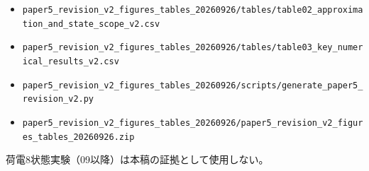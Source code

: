 \documentclass[
  a4paper,
]{ltjsarticle}
\begin{document}
\begin{itemize}
\item
  \texttt{paper5\_\allowbreak{}revision\_\allowbreak{}v2\_\allowbreak{}figures\_\allowbreak{}tables\_\allowbreak{}20260926/\allowbreak{}tables/\allowbreak{}table02\_\allowbreak{}approximation\_\allowbreak{}and\_\allowbreak{}state\_\allowbreak{}scope\_\allowbreak{}v2.csv}
\item
  \texttt{paper5\_\allowbreak{}revision\_\allowbreak{}v2\_\allowbreak{}figures\_\allowbreak{}tables\_\allowbreak{}20260926/\allowbreak{}tables/\allowbreak{}table03\_\allowbreak{}key\_\allowbreak{}numerical\_\allowbreak{}results\_\allowbreak{}v2.csv}
\item
  \texttt{paper5\_\allowbreak{}revision\_\allowbreak{}v2\_\allowbreak{}figures\_\allowbreak{}tables\_\allowbreak{}20260926/\allowbreak{}scripts/\allowbreak{}generate\_\allowbreak{}paper5\_\allowbreak{}revision\_\allowbreak{}v2.py}
\item
  \texttt{paper5\_\allowbreak{}revision\_\allowbreak{}v2\_\allowbreak{}figures\_\allowbreak{}tables\_\allowbreak{}20260926/\allowbreak{}paper5\_\allowbreak{}revision\_\allowbreak{}v2\_\allowbreak{}figures\_\allowbreak{}tables\_\allowbreak{}20260926.zip}
\end{itemize}

荷電8状態実験（09以降）は本稿の証拠として使用しない。
\end{document}
